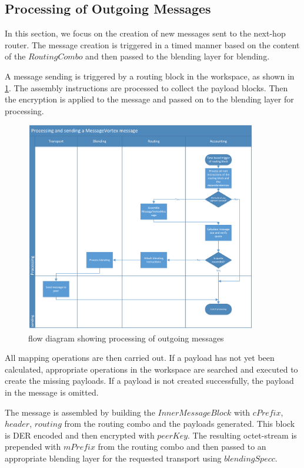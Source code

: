 \subsection{Processing of Outgoing Messages\label{sec:processingOutgoingMessages}}
In this section, we focus on the creation of new messages sent to the next-hop router. The message creation is triggered in a timed manner based on the content of the $RoutingCombo$ and then passed to the blending layer for blending.

A message sending is triggered by a routing block in the workspace, as shown in \cref{fig:msgSendProcessing}. The assembly instructions are processed to collect the payload blocks. Then the encryption is applied to the message and passed on to the blending layer for processing.

\begin{figure}[ht]
	\centering
	\includegraphics[width=0.90\textwidth]{inc/flowchart_message_sending}
	\caption{flow diagram showing processing of outgoing messages}
	\label{fig:msgSendProcessing}
\end{figure}

All mapping operations are then carried out. If a payload has not yet been calculated, appropriate operations in the workspace are searched and executed to create the missing payloads. If a payload is not created successfully, the payload in the message is omitted. 

The message is assembled by building the $InnerMessageBlock$ with $cPrefix$, $header$, $routing$ from the routing combo and the payloads generated. This block is DER encoded and then encrypted with $peerKey$. The resulting octet-stream is prepended with $mPrefix$ from the routing combo and then passed to an appropriate blending layer for the requested transport using $blendingSpecc$.

